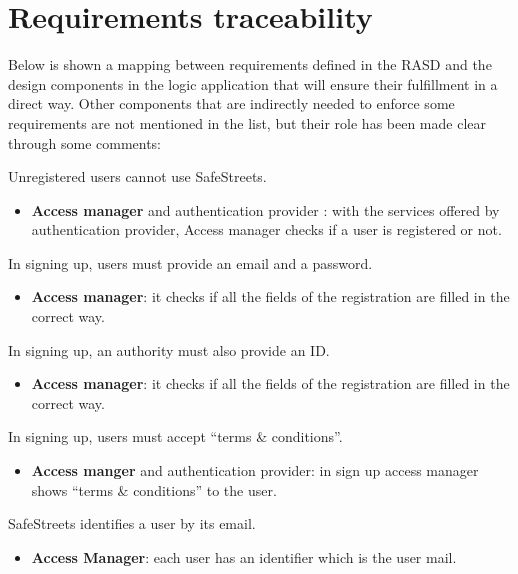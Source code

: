 \documentclass[../RASD.tex]{subfiles}
\begin{document}
    \chapter{Requirements traceability}\label{ch:requirements-traceability}
    Below is shown a mapping between requirements defined in the RASD and the design components in the logic application
    that will ensure their fulfillment in a direct way.
    Other components that are indirectly needed to enforce some requirements are not mentioned in the list,
    but their role has been made clear through some comments:
    \begin{enumerate}
         Unregistered users cannot use SafeStreets.
        \begin{itemize}
            \item \textbf{Access manager} and authentication provider : with the services offered by authentication provider,
            Access manager checks if a user is registered or not.
        \end{itemize}

         In signing up, users must provide an email and a password.
        \begin{itemize}
            \item \textbf{Access manager}: it checks if all the fields of the registration are filled in the correct way.
        \end{itemize}

         In signing up, an authority must also provide an ID\@.
        \begin{itemize}
            \item \textbf{Access manager}: it checks if all the fields of the registration are filled in the correct way.
        \end{itemize}

         In signing up, users must accept “terms \& conditions”.
        \begin{itemize}
            \item \textbf{Access manger} and authentication provider: in sign up access manager shows “terms \& conditions” to the user.
        \end{itemize}

         SafeStreets identifies a user by its email.
        \begin{itemize}
            \item \textbf{Access Manager}: each user has an identifier which is the user mail.
        \end{itemize}


\end{enumerate}
\end{document}

